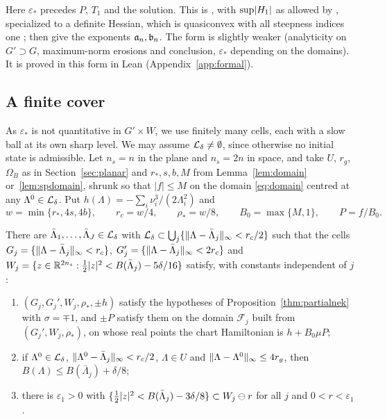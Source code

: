 Here $\varepsilon_*$ precedes $P$, $T_1$ and the solution. This is
\cite[Theorem~4.4, p.~30]{Nek77}, with $\sup\lvert H_1\rvert$ as allowed by \cite[Remark~4.5.A]{Nek77}, specialized to a
definite Hessian, which is quasiconvex with all steepness indices one \cite[\S1.11, p.~9]{Nek77}; then
\cite[(4.1), (4.4), (4.5)]{Nek77} give the exponents $\mathfrak{a}_n{},\mathfrak{b}_n{}$. The form is slightly weaker
(analyticity on $G'\supset G$, maximum-norm erosions and conclusion, $\varepsilon_*$ depending on the domains). It is proved in this form in Lean (Appendix~\ref{app:formal}).

\subsection{A finite cover}

As $\varepsilon_*$ is not quantitative in $G'\times W$, we use finitely many cells, each with a slow ball at its
own sharp level. We may assume
$\mathcal{L}_\delta\ne\emptyset$, since otherwise no initial state is admissible. Let $n_s=n$ in the plane and $n_s=2n$
in space, and take $U$, $r_g$, $\Omega_B$ as in Section~\ref{sec:planar} and $r_*,s,b,M$ from
Lemma~\ref{lem:domain} or~\ref{lem:spdomain}, shrunk so that $|f|\le M$ on the domain \eqref{eq:domain}
centred at any $\Lambda^0\in\mathcal{L}_\delta$. Put $h(\Lambda)=-\sum_i\nu_i^3/(2\Lambda_i^2)$ and
\[
  w=\min\{r_*,4s,4b\},\qquad r_c=w/4,\qquad\rho_*=w/8,\qquad B_0=\max\{M,1\},\qquad P=f/B_0.
\]

\begin{lemma}\label{lem:cover}
There are $\bar\Lambda_1,\dots,\bar\Lambda_J\in\mathcal{L}_\delta$ with
$\mathcal{L}_\delta\subset\bigcup_j\{\lVert \Lambda-\bar\Lambda_j\rVert_\infty<r_c/2\}$ such that the cells
$G_j=\{\lVert \Lambda-\bar\Lambda_j\rVert_\infty<r_c\}$, $G_j'=\{\lVert \Lambda-\bar\Lambda_j\rVert_\infty<2r_c\}$ and
$W_j=\{z\in\mathbb{R}^{2n_s}:\frac12\lvert z\rvert^2<B(\bar\Lambda_j)-5\delta/16\}$ satisfy, with constants independent of $j$:
\begin{enumerate}[label=(\roman*)]
\item $(G_j,G_j',W_j,\rho_*,\pm h)$ satisfy the hypotheses of Proposition~\ref{thm:partialnek} with
  $\sigma=\mp1$, and $\pm P$ satisfy them on the domain $\mathcal F_j$ built from $(G_j',W_j,\rho_*)$, on whose
  real points the chart Hamiltonian is $h+B_0\mu P$;
\item if $\Lambda^0\in\mathcal{L}_\delta$, $\lVert \Lambda^0-\bar\Lambda_j\rVert_\infty<r_c/2$, $\Lambda\in U$ and
  $\lVert \Lambda-\Lambda^0\rVert_\infty\le4r_g$, then $B(\Lambda)\le B(\bar\Lambda_j)+\delta/8$;
\item there is $\varepsilon_1>0$ with $\{\frac12\lvert z\rvert^2<B(\bar\Lambda_j)-3\delta/8\}\subset W_j\ominus r$ for all
  $j$ and $0<r<\varepsilon_1$.
\end{enumerate}
\end{lemma}

